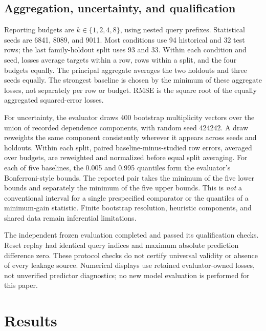 \documentclass{article}
\begin{document}
\subsection{Aggregation, uncertainty, and qualification}
Reporting budgets are $k\in\{1,2,4,8\}$, using nested query prefixes. Statistical seeds are 6841, 8089, and 9011. Most conditions use 94 historical and 32 test rows; the last family-holdout split uses 93 and 33. Within each condition and seed, losses average targets within a row, rows within a split, and the four budgets equally. The principal aggregate averages the two holdouts and three seeds equally. The strongest baseline is chosen by the minimum of these aggregate losses, not separately per row or budget. RMSE is the square root of the equally aggregated squared-error losses.

For uncertainty, the evaluator draws 400 bootstrap multiplicity vectors over the union of recorded dependence components, with random seed 424242. A draw reweights the same component consistently wherever it appears across seeds and holdouts. Within each split, paired baseline-minus-studied row errors, averaged over budgets, are reweighted and normalized before equal split averaging. For each of five baselines, the 0.005 and 0.995 quantiles form the evaluator's Bonferroni-style bounds. The reported pair takes the minimum of the five lower bounds and separately the minimum of the five upper bounds. This is \emph{not} a conventional interval for a single prespecified comparator or the quantiles of a minimum-gain statistic. Finite bootstrap resolution, heuristic components, and shared data remain inferential limitations.

The independent frozen evaluation completed and passed its qualification checks. Reset replay had identical query indices and maximum absolute prediction difference zero. These protocol checks do not certify universal validity or absence of every leakage source. Numerical displays use retained evaluator-owned losses, not unverified predictor diagnostics; no new model evaluation is performed for this paper.

\section{Results}
\end{document}
